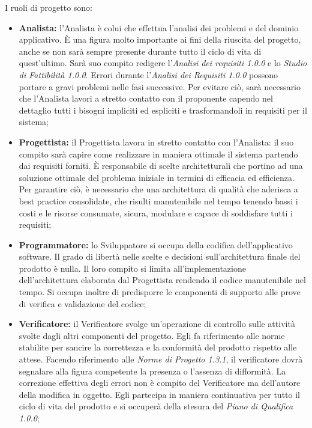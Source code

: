 			\noindent I ruoli di progetto sono:
			\begin{itemize}
				\item \textbf{Analista:} l'Analista è colui che effettua l'analisi dei problemi e del dominio applicativo. \`{E} una figura molto importante ai fini della riuscita del progetto, anche se non sarà sempre presente durante tutto il ciclo di vita di quest'ultimo. Sarà suo compito redigere l'\textit{Analisi dei requisiti 1.0.0\doc} e lo \textit{Studio di Fattibilità 1.0.0\doc}. Errori durante l'\textit{Analisi dei Requisiti 1.0.0\doc} possono portare a gravi problemi nelle fasi successive. Per evitare ciò, sarà necessario che l'Analista lavori a stretto contatto con il proponente capendo nel dettaglio tutti i bisogni impliciti ed espliciti e trasformandoli in requisiti per il sistema;
				\item \textbf{Progettista:} il Progettista lavora in stretto contatto con l'Analista: il suo compito sarà capire come realizzare in maniera ottimale il sistema partendo dai requisiti forniti. È responsabile di scelte architetturali che portino ad una soluzione ottimale del problema iniziale in termini di efficacia ed efficienza. Per garantire ciò, è necessario che una architettura di qualità che aderisca a best practice consolidate, che risulti manutenibile nel tempo tenendo bassi i costi e le risorse consumate, sicura, modulare e capace di soddisfare tutti i requisiti;
				\item \textbf{Programmatore:} lo Sviluppatore si occupa della codifica dell'applicativo software. Il grado di libertà nelle scelte e decisioni sull'architettura finale del prodotto è nulla. Il loro compito si limita all'implementazione dell'architettura elaborata dal Progettista rendendo il codice manutenibile nel tempo. Si occupa inoltre di predisporre le componenti di supporto alle prove di verifica e validazione del codice;
				\item \textbf{Verificatore:} il Verificatore svolge un'operazione di controllo sulle attività svolte dagli altri componenti del progetto. Egli fa riferimento alle norme stabilite per sancire la correttezza e la conformità del prodotto rispetto alle attese. Facendo riferimento alle \textit{Norme di Progetto 1.3.1\doc}, il verificatore dovrà segnalare alla figura competente la presenza o l'assenza di difformità. La correzione effettiva degli errori non è compito del Verificatore ma dell'autore della modifica in oggetto. Egli partecipa in maniera continuativa per tutto il ciclo di vita del prodotto e si occuperà della stesura del \textit{Piano di Qualifica 1.0.0\docs};

\end{itemize}
